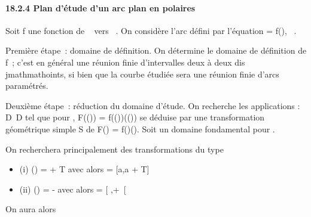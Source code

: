 \documentclass[]{article}
\begin{document}
\paragraph{18.2.4 Plan d'étude d'un arc plan en polaires}

Soit f une fonction de ~ vers ~. On considère l'arc défini par
l'équation \rho = f(\theta), \theta \in {}~.

Première étape~: domaine de définition. On détermine le domaine de
définition de f~; c'est en général une réunion finie d'intervalles deux
à deux dis\\jmathmathoints, si bien que la courbe étudiée sera une réunion finie
d'arcs paramétrés.

Deuxième étape~: réduction du domaine d'étude. On recherche les
applications \sigma : D\rightarrow~D tel que pour \theta \inD, F(\sigma(\theta)) =
f(\sigma(\theta))\vecu(\sigma(\theta)) se déduise par une transformation
géométrique simple S de F(\theta) = f(\theta)\vecu(\theta). Soit \Delta
un domaine fondamental pour \sigma.

On recherchera principalement des transformations \theta du type

\begin{itemize}
\itemsep1pt\parskip0pt
\item
  (i) \sigma(\theta) = \theta + T avec alors \Delta = {[}a,a + T{]} \bigcapD
\item
  (ii) \sigma(\theta) = \omega - \theta avec alors \Delta = {[} \omega {}
  ,+\infty~{[}\bigcapD
\end{itemize}

On aura alors
\end{document}
